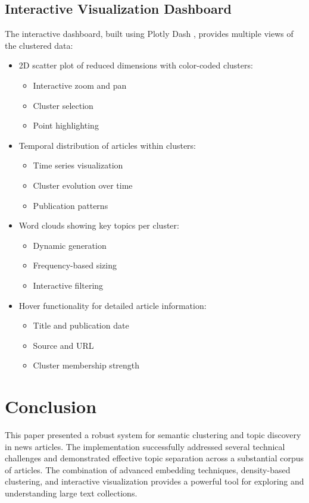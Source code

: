 \documentclass[conference]{IEEEtran}
\begin{document}
\subsection{Interactive Visualization Dashboard}
The interactive dashboard, built using Plotly Dash \citep{plotly2015}, provides multiple views of the clustered data:
\begin{itemize}
    \item 2D scatter plot of reduced dimensions with color-coded clusters:
        \begin{itemize}
            \item Interactive zoom and pan
            \item Cluster selection
            \item Point highlighting
        \end{itemize}
    \item Temporal distribution of articles within clusters:
        \begin{itemize}
            \item Time series visualization
            \item Cluster evolution over time
            \item Publication patterns
        \end{itemize}
    \item Word clouds showing key topics per cluster:
        \begin{itemize}
            \item Dynamic generation
            \item Frequency-based sizing
            \item Interactive filtering
        \end{itemize}
    \item Hover functionality for detailed article information:
        \begin{itemize}
            \item Title and publication date
            \item Source and URL
            \item Cluster membership strength
        \end{itemize}
\end{itemize}

\section{Conclusion}
This paper presented a robust system for semantic clustering and topic discovery in news articles. The implementation successfully addressed several technical challenges and demonstrated effective topic separation across a substantial corpus of articles. The combination of advanced embedding techniques, density-based clustering, and interactive visualization provides a powerful tool for exploring and understanding large text collections.
\end{document}
